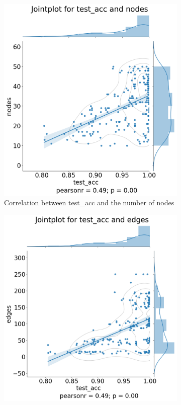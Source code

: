 \begin{figure}[H]
    \centering
    \begin{subfigure}{0.45\textwidth}
        \includegraphics[width=\linewidth]{images/results/random/gru/jointplot_test_acc_nodes.png}
        \caption{Correlation between test\_acc and the number of nodes} \label{fig:jp_gru_node}
    \end{subfigure}%
    \hfill
    \begin{subfigure}{0.45\textwidth}
        \includegraphics[width=\linewidth]{images/results/random/gru/jointplot_test_acc_edges.png}

\end{subfigure}
\end{figure}
